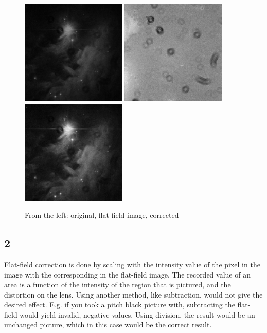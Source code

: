\begin{figure}[h!]
    \centering
    \includegraphics[width=5cm]{../LAB1/img/disturbed_potw1144a.png}
    \includegraphics[width=5cm]{../LAB1/img/flatfieldimage.png}
    \includegraphics[width=5cm]{../LAB1/output/disturbed_potw1144a.png}
    \caption{From the left: original, flat-field image, corrected}
\end{figure}


\subsection*{2}
Flat-field correction is done by scaling with the intensity value of the pixel
in the image with the corresponding in the flat-field image.
The recorded value of an area is a function of the intensity of the region that is pictured,
and the distortion on the lens.
Using another method, like subtraction, would not give the desired effect.
E.g. if you took a pitch black picture with, subtracting the flat-field would yield invalid, negative values.
Using division, the result would be an unchanged picture, which in this case would be the correct result.



